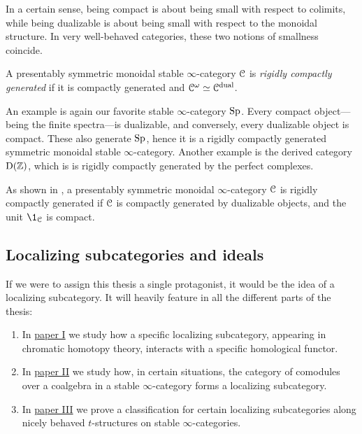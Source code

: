 In a certain sense, being compact is about being small with respect to colimits, while being dualizable is about being small with respect to the monoidal structure. In very well-behaved categories, these two notions of smallness coincide. 

\begin{definition}
    \label{ch0:rigidly-generated-category}
    A presentably symmetric monoidal stable $\infty$-category $\EuScript{C}$ is \emph{rigidly compactly generated} if it is compactly generated and $\EuScript{C}^\omega\simeq \EuScript{C}^{\mathrm{dual}}$. 
\end{definition}

\begin{example}
    An example is again our favorite stable $\infty$-category $\mathrm{Sp}$. Every compact object---being the finite spectra---is dualizable, and conversely, every dualizable object is compact. These also generate $\mathrm{Sp}$, hence it is a rigidly compactly generated symmetric monoidal stable $\infty$-category. Another example is the derived category $\mathrm{D}(\mathbb{Z})$, which is is rigidly compactly generated by the perfect complexes. 
\end{example}

\begin{remark}
    \label{ch0:rm:compacts-equal-dualizable}
    As shown in \cite[2.1.3]{hovey-palmiery-strickland_97}, a presentably symmetric monoidal $\infty$-category $\EuScript{C}$ is rigidly compactly generated if $\EuScript{C}$ is compactly generated by dualizable objects, and the unit $\1_\C$ is compact. 
\end{remark}







\subsection{Localizing subcategories and ideals}
\label{ch0:ssec:localizing-subcategories-and-ideals}

If we were to assign this thesis a single protagonist, it would be the idea of a localizing subcategory. It will heavily feature in all the different parts of the thesis: 
\begin{enumerate}
    \item In \hyperref[ch1]{paper I} we study how a specific localizing subcategory, appearing in chromatic homotopy theory, interacts with a specific homological functor.
    \item In \hyperref[ch2]{paper II} we study how, in certain situations, the category of comodules over a coalgebra in a stable $\infty$-category forms a localizing subcategory. 
    \item In \hyperref[ch3]{paper III} we prove a classification for certain localizing subcategories along nicely behaved $t$-structures on stable $\infty$-categories. 
\end{enumerate}

